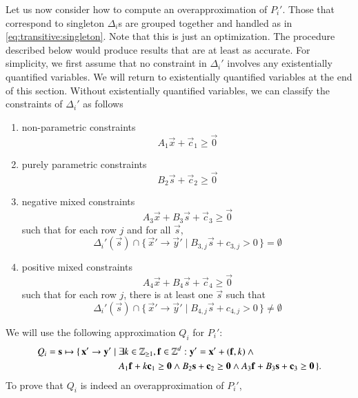 Let us now consider how to compute an overapproximation of $P_i'$.
Those that correspond to singleton $\Delta_i$s are grouped together
and handled as in \eqref{eq:transitive:singleton}.
Note that this is just an optimization.  The procedure described
below would produce results that are at least as accurate.
For simplicity, we first assume that no constraint in $\Delta_i'$
involves any existentially quantified variables.
We will return to existentially quantified variables at the end
of this section.
Without existentially quantified variables, we can classify
the constraints of $\Delta_i'$ as follows
\begin{enumerate}
\item non-parametric constraints
\begin{equation}
\label{eq:transitive:non-parametric}
A_1 \vec x + \vec c_1 \geq \vec 0
\end{equation}
\item purely parametric constraints
\begin{equation}
\label{eq:transitive:parametric}
B_2 \vec s + \vec c_2 \geq \vec 0
\end{equation}
\item negative mixed constraints
\begin{equation}
\label{eq:transitive:mixed}
A_3 \vec x + B_3 \vec s + \vec c_3 \geq \vec 0
\end{equation}
such that for each row $j$ and for all $\vec s$,
$$
\Delta_i'(\vec s) \cap
\{\, \vec x' \to \vec y' \mid B_{3,j} \vec s + c_{3,j} > 0 \,\}
= \emptyset
$$
\item positive mixed constraints
$$
A_4 \vec x + B_4 \vec s + \vec c_4 \geq \vec 0
$$
such that for each row $j$, there is at least one $\vec s$ such that
$$
\Delta_i'(\vec s) \cap
\{\, \vec x' \to \vec y' \mid B_{4,j} \vec s + c_{4,j} > 0 \,\}
\ne \emptyset
$$
\end{enumerate}
We will use the following approximation $Q_i$ for $P_i'$:
\begin{equation}
\label{eq:transitive:Q}
\begin{aligned}
Q_i = \vec s \mapsto
\{\,
\vec x' \to \vec y'
\mid {} & \exists k \in \Z_{\ge 1}, \vec f \in \Z^d :
\vec y' = \vec x' + (\vec f, k)
\wedge {}
\\
&
A_1 \vec f + k \vec c_1 \geq \vec 0
\wedge
B_2 \vec s + \vec c_2 \geq \vec 0
\wedge
A_3 \vec f + B_3 \vec s + \vec c_3 \geq \vec 0
\,\}
.
\end{aligned}
\end{equation}
To prove that $Q_i$ is indeed an overapproximation of $P_i'$,
